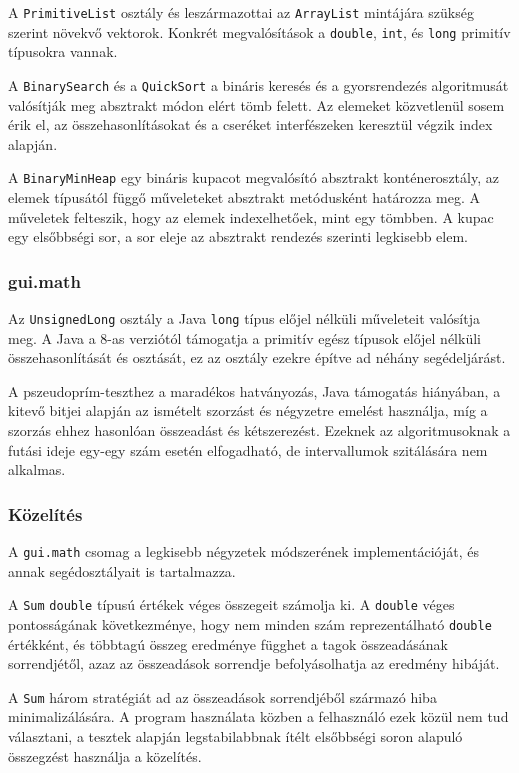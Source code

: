 A \texttt{PrimitiveList} osztály és leszármazottai az \texttt{ArrayList} mintájára szükség szerint növekvő vektorok. Konkrét megvalósítások a \texttt{double}, \texttt{int}, és \texttt{long} primitív típusokra vannak.

A \texttt{BinarySearch} és a \texttt{QuickSort} a bináris keresés és a gyorsrendezés algoritmusát valósítják meg absztrakt módon elért tömb felett.
Az elemeket közvetlenül sosem érik el, az összehasonlításokat és a cseréket interfészeken keresztül végzik index alapján.

A \texttt{BinaryMinHeap} egy bináris kupacot megvalósító absztrakt konténerosztály, az elemek típusától függő műveleteket absztrakt metódusként határozza meg.
A műveletek felteszik, hogy az elemek indexelhetőek, mint egy tömbben.
A kupac egy elsőbbségi sor, a sor eleje az absztrakt rendezés szerinti legkisebb elem.

\subsubsection{gui.math}

Az \texttt{UnsignedLong} osztály a Java \texttt{long} típus előjel nélküli műveleteit valósítja meg.
A Java a 8-as verziótól támogatja a primitív egész típusok előjel nélküli összehasonlítását és osztását, ez az osztály ezekre építve ad néhány segédeljárást.

A pszeudoprím-teszthez a maradékos hatványozás, Java támogatás hiányában, a kitevő bitjei alapján az ismételt szorzást és négyzetre emelést használja, míg a szorzás ehhez hasonlóan összeadást és kétszerezést.
Ezeknek az algoritmusoknak a futási ideje egy-egy szám esetén elfogadható, de intervallumok szitálására nem alkalmas.

\subsubsection{Közelítés}

A \texttt{gui.math} csomag a legkisebb négyzetek módszerének implementációját, és annak segédosztályait is tartalmazza.

A \texttt{Sum} \texttt{double} típusú értékek véges összegeit számolja ki.
A \texttt{double} véges pontosságának következménye, hogy nem minden szám reprezentálható \texttt{double} értékként, és többtagú összeg eredménye függhet a tagok összeadásának sorrendjétől, azaz az összeadások sorrendje befolyásolhatja az eredmény hibáját.

A \texttt{Sum} három stratégiát ad az összeadások sorrendjéből származó hiba minimalizálására.
A program használata közben a felhasználó ezek közül nem tud választani, a tesztek alapján legstabilabbnak ítélt elsőbbségi soron alapuló összegzést használja a közelítés.

